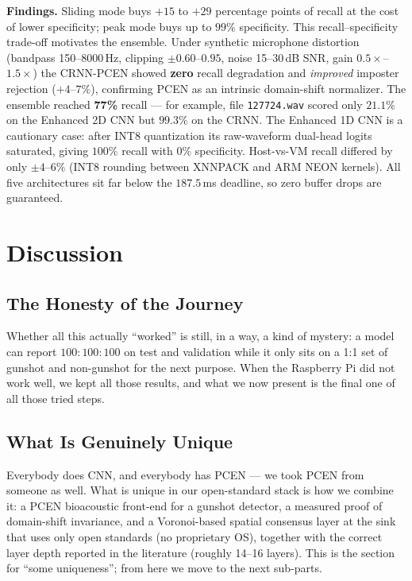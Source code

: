 \documentclass[conference]{IEEEtran}
\begin{document}
\noindent\textbf{Findings.} Sliding mode buys $+15$ to $+29$ percentage points of recall at the cost of lower
specificity; peak mode buys up to $99\%$ specificity. This recall--specificity trade-off motivates the
ensemble. Under synthetic microphone distortion (bandpass 150--8000\,Hz, clipping $\pm0.60$--$0.95$, noise
15--30\,dB SNR, gain $0.5\times$--$1.5\times$) the CRNN-PCEN showed \textbf{zero} recall degradation and
\emph{improved} imposter rejection ($+4$--$7\%$), confirming PCEN as an intrinsic domain-shift normalizer. The
ensemble reached \textbf{77\%} recall --- for example, file \texttt{127724.wav} scored only $21.1\%$ on the
Enhanced 2D CNN but $99.3\%$ on the CRNN. The Enhanced 1D CNN is a cautionary case: after INT8 quantization
its raw-waveform dual-head logits saturated, giving $100\%$ recall with $0\%$ specificity. Host-vs-VM recall
differed by only $\pm4$--$6\%$ (INT8 rounding between XNNPACK and ARM NEON kernels). All five architectures
sit far below the $187.5$\,ms deadline, so zero buffer drops are guaranteed.

\section{Discussion}
\label{sec:discussion}
\subsection{The Honesty of the Journey}
Whether all this actually ``worked'' is still, in a way, a kind of mystery: a model can report
$100{:}100{:}100$ on test and validation while it only sits on a 1:1 set of gunshot and non-gunshot for the
next purpose. When the Raspberry Pi did not work well, we kept all those results, and what we now present is
the final one of all those tried steps.

\subsection{What Is Genuinely Unique}
\label{sec:unique}
Everybody does CNN, and everybody has PCEN --- we took PCEN from someone as well. What is unique in our
open-standard stack is how we combine it: a PCEN bioacoustic front-end for a gunshot detector, a measured
proof of domain-shift invariance, and a Voronoi-based spatial consensus layer at the sink that uses only open
standards (no proprietary OS), together with the correct layer depth reported in the literature (roughly
14--16 layers). This is the section for ``some uniqueness''; from here we move to the next sub-parts.
\end{document}
